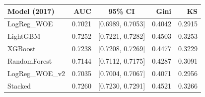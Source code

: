 \begin{tabular}{lrcrr}
\toprule
Model (2017) & AUC & 95\% CI & Gini & KS \\
\midrule
LogReg\_WOE & 0.7021 & [0.6989, 0.7053] & 0.4042 & 0.2915 \\
LightGBM & 0.7252 & [0.7221, 0.7282] & 0.4503 & 0.3253 \\
XGBoost & 0.7238 & [0.7208, 0.7269] & 0.4477 & 0.3229 \\
RandomForest & 0.7144 & [0.7112, 0.7175] & 0.4287 & 0.3091 \\
LogReg\_WOE\_v2 & 0.7035 & [0.7004, 0.7067] & 0.4071 & 0.2956 \\
Stacked & 0.7260 & [0.7230, 0.7291] & 0.4521 & 0.3266 \\
\bottomrule
\end{tabular}
